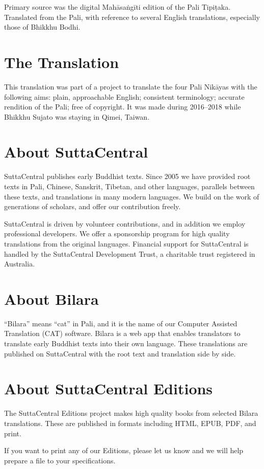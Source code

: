 \documentclass[12pt,openany]{book}%
\begin{document}
Primary source was the digital \textsanskrit{Mahāsaṅgīti} edition of the Pali \textsanskrit{Tipiṭaka}. Translated from the Pali, with reference to several English translations, especially those of Bhikkhu Bodhi.

\section*{The Translation}

This translation was part of a project to translate the four Pali \textsanskrit{Nikāyas} with the following aims: plain, approachable English; consistent terminology; accurate rendition of the Pali; free of copyright. It was made during 2016–2018 while Bhikkhu Sujato was staying in Qimei, Taiwan.

\section*{About SuttaCentral}

SuttaCentral publishes early Buddhist texts. Since 2005 we have provided root texts in Pali, Chinese, Sanskrit, Tibetan, and other languages, parallels between these texts, and translations in many modern languages. We build on the work of generations of scholars, and offer our contribution freely.

SuttaCentral is driven by volunteer contributions, and in addition we employ professional developers. We offer a sponsorship program for high quality translations from the original languages. Financial support for SuttaCentral is handled by the SuttaCentral Development Trust, a charitable trust registered in Australia.

\section*{About Bilara}

“Bilara” means “cat” in Pali, and it is the name of our Computer Assisted Translation (CAT) software. Bilara is a web app that enables translators to translate early Buddhist texts into their own language. These translations are published on SuttaCentral with the root text and translation side by side.

\section*{About SuttaCentral Editions}

The SuttaCentral Editions project makes high quality books from selected Bilara translations. These are published in formats including HTML, EPUB, PDF, and print.

If you want to print any of our Editions, please let us know and we will help prepare a file to your specifications.

%
\end{document}

